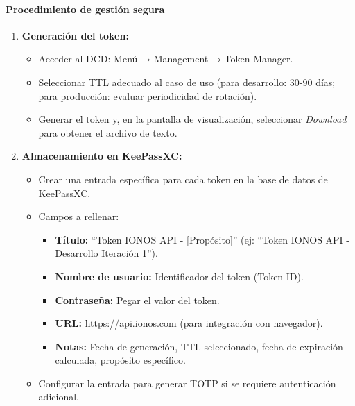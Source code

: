 \paragraph{Procedimiento de gestión segura}
\vspace{0.25cm}
\begin{enumerate}
    \item \textbf{Generación del token:}
          \begin{itemize}
              \item Acceder al DCD: Menú → Management → Token Manager.
              \item Seleccionar TTL adecuado al caso de uso (para desarrollo: 30-90 días; para producción: evaluar periodicidad de rotación).
              \item Generar el token y, en la pantalla de visualización, seleccionar \textit{Download} para obtener el archivo de texto.
          \end{itemize}

    \item \textbf{Almacenamiento en KeePassXC:}
          \begin{itemize}
              \item Crear una entrada específica para cada token en la base de datos de KeePassXC.
              \item Campos a rellenar:
                    \begin{itemize}
                        \item \textbf{Título:} ``Token IONOS API - [Propósito]'' (ej: ``Token IONOS API - Desarrollo Iteración 1'').
                        \item \textbf{Nombre de usuario:} Identificador del token (Token ID).
                        \item \textbf{Contraseña:} Pegar el valor del token.
                        \item \textbf{URL:} https://api.ionos.com (para integración con navegador).
                        \item \textbf{Notas:} Fecha de generación, TTL seleccionado, fecha de expiración calculada, propósito específico.
                    \end{itemize}
              \item Configurar la entrada para generar TOTP si se requiere autenticación adicional.
          \end{itemize}


\end{enumerate}
